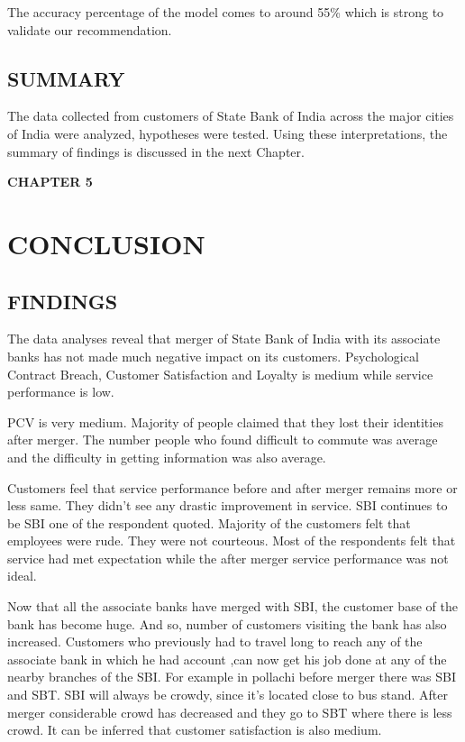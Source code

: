 \documentclass[a4paper, 12pt]{extarticle}
\begin{document}
{The accuracy percentage of the model comes to around 55\% which is strong to validate our recommendation.
\subsection{SUMMARY}

The data collected from customers of State Bank of India across the major cities of India were analyzed, hypotheses were tested. Using these interpretations, the summary of findings is discussed in the next Chapter.

\newpage
\begin{center}
\textbf{\large CHAPTER 5}
\end{center}
\section{CONCLUSION}
\subsection{FINDINGS}
The data analyses reveal that merger of State Bank of India with its associate banks has not made much negative impact on its customers. Psychological Contract Breach, Customer Satisfaction and Loyalty is medium while service performance is low.

PCV is very medium. Majority of people claimed that they lost their identities after merger. The number people who found difficult to commute was average and the difficulty in getting information was also average.

Customers feel that service performance before and after merger remains more or less same. They didn't see any drastic improvement in service. SBI continues to be SBI one of the respondent quoted. Majority of the customers felt that employees were rude. They were not courteous. Most of the respondents felt that service had met expectation while the after merger service performance was not ideal.

Now that all the associate banks have merged with SBI, the customer base of the bank has become huge. And so, number of customers visiting the bank has also increased. Customers who previously had to travel long to reach any of the associate bank in which he had account ,can now get his job done at any of the nearby branches of the SBI. For example in pollachi before merger there was SBI and SBT. SBI will always be crowdy, since it's located close to bus stand. After merger considerable crowd has decreased and they go to SBT where there is less crowd. It can be inferred that customer satisfaction is also medium.

}
\end{document}

